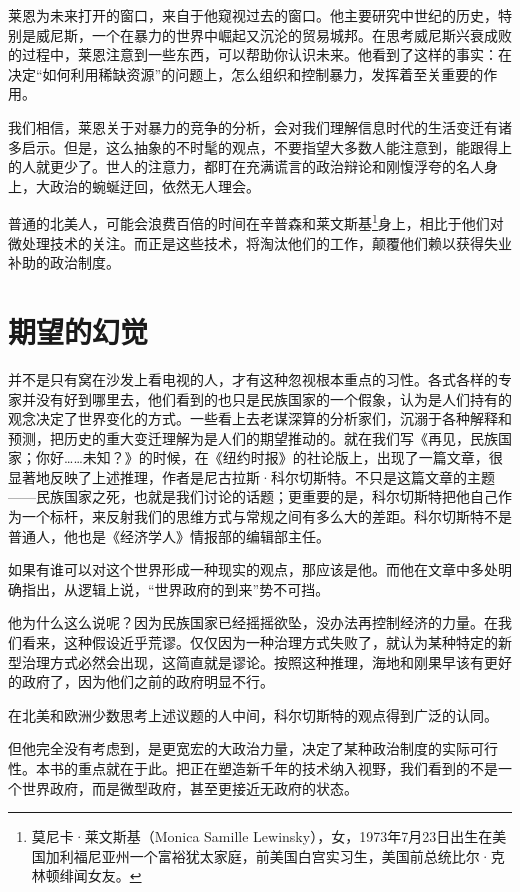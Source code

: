 莱恩为未来打开的窗口，来自于他窥视过去的窗口。他主要研究中世纪的历史，特别是威尼斯，一个在暴力的世界中崛起又沉沦的贸易城邦。在思考威尼斯兴衰成败的过程中，莱恩注意到一些东西，可以帮助你认识未来。他看到了这样的事实：在决定“如何利用稀缺资源”的问题上，怎么组织和控制暴力，发挥着至关重要的作用。


我们相信，莱恩关于对暴力的竞争的分析，会对我们理解信息时代的生活变迁有诸多启示。但是，这么抽象的不时髦的观点，不要指望大多数人能注意到，能跟得上的人就更少了。世人的注意力，都盯在充满谎言的政治辩论和刚愎浮夸的名人身上，大政治的蜿蜒迂回，依然无人理会。


普通的北美人，可能会浪费百倍的时间在辛普森和莱文斯基\footnote{莫尼卡·莱文斯基（Monica Samille Lewinsky），女，1973年7月23日出生在美国加利福尼亚州一个富裕犹太家庭，前美国白宫实习生，美国前总统比尔·克林顿绯闻女友。}身上，相比于他们对微处理技术的关注。而正是这些技术，将淘汰他们的工作，颠覆他们赖以获得失业补助的政治制度。


\section{期望的幻觉}

并不是只有窝在沙发上看电视的人，才有这种忽视根本重点的习性。各式各样的专家并没有好到哪里去，他们看到的也只是民族国家的一个假象，认为是人们持有的观念决定了世界变化的方式。一些看上去老谋深算的分析家们，沉溺于各种解释和预测，把历史的重大变迁理解为是人们的期望推动的。就在我们写《再见，民族国家；你好……未知？》的时候，在《纽约时报》的社论版上，出现了一篇文章，很显著地反映了上述推理，作者是尼古拉斯·科尔切斯特。不只是这篇文章的主题——民族国家之死，也就是我们讨论的话题；更重要的是，科尔切斯特把他自己作为一个标杆，来反射我们的思维方式与常规之间有多么大的差距。科尔切斯特不是普通人，他也是《经济学人》情报部的编辑部主任。

如果有谁可以对这个世界形成一种现实的观点，那应该是他。而他在文章中多处明确指出，从逻辑上说，“世界政府的到来”势不可挡。

他为什么这么说呢？因为民族国家已经摇摇欲坠，没办法再控制经济的力量。在我们看来，这种假设近乎荒谬。仅仅因为一种治理方式失败了，就认为某种特定的新型治理方式必然会出现，这简直就是谬论。按照这种推理，海地和刚果早该有更好的政府了，因为他们之前的政府明显不行。


在北美和欧洲少数思考上述议题的人中间，科尔切斯特的观点得到广泛的认同。

但他完全没有考虑到，是更宽宏的大政治力量，决定了某种政治制度的实际可行性。本书的重点就在于此。把正在塑造新千年的技术纳入视野，我们看到的不是一个世界政府，而是微型政府，甚至更接近无政府的状态。

